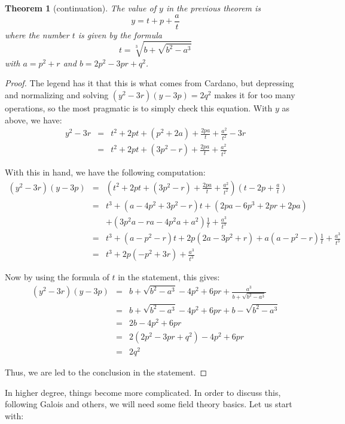 \documentclass[12pt]{amsbook}
\newtheorem{theorem}{Theorem}[chapter]
\begin{document}
\begin{theorem}[continuation]
The value of $y$ in the previous theorem is
$$y=t+p+\frac{a}{t}$$
where the number $t$ is given by the formula
$$t=\sqrt[3]{b+\sqrt{b^2-a^3}}$$
with $a=p^2+r$ and $b=2p^2-3pr+q^2$.
\end{theorem}

\begin{proof}
The legend has it that this is what comes from Cardano, but depressing and normalizing and solving $(y^2-3r)(y-3p)=2q^2$ makes it for too many operations, so the most pragmatic is to simply check this equation. With $y$ as above, we have:
\begin{eqnarray*}
y^2-3r
&=&t^2+2pt+(p^2+2a)+\frac{2pa}{t}+\frac{a^2}{t^2}-3r\\
&=&t^2+2pt+(3p^2-r)+\frac{2pa}{t}+\frac{a^2}{t^2}
\end{eqnarray*}

With this in hand, we have the following computation:
\begin{eqnarray*}
(y^2-3r)(y-3p)
&=&\left(t^2+2pt+(3p^2-r)+\frac{2pa}{t}+\frac{a^2}{t^2}\right)\left(t-2p+\frac{a}{t}\right)\\
&=&t^3+(a-4p^2+3p^2-r)t+(2pa-6p^3+2pr+2pa)\\
&&+(3p^2a-ra-4p^2a+a^2)\frac{1}{t}+\frac{a^3}{t^3}\\
&=&t^3+(a-p^2-r)t+2p(2a-3p^2+r)+a(a-p^2-r)\frac{1}{t}+\frac{a^3}{t^3}\\
&=&t^3+2p(-p^2+3r)+\frac{a^3}{t^3}
\end{eqnarray*}

Now by using the formula of $t$ in the statement, this gives:
\begin{eqnarray*}
(y^2-3r)(y-3p)
&=&b+\sqrt{b^2-a^3}-4p^2+6pr+\frac{a^3}{b+\sqrt{b^2-a^3}}\\
&=&b+\sqrt{b^2-a^3}-4p^2+6pr+b-\sqrt{b^2-a^3}\\
&=&2b-4p^2+6pr\\
&=&2(2p^2-3pr+q^2)-4p^2+6pr\\
&=&2q^2
\end{eqnarray*}

Thus, we are led to the conclusion in the statement.
\end{proof}

In higher degree, things become more complicated. In order to discuss this, following Galois and others, we will need some field theory basics. Let us start with:


\end{document}
